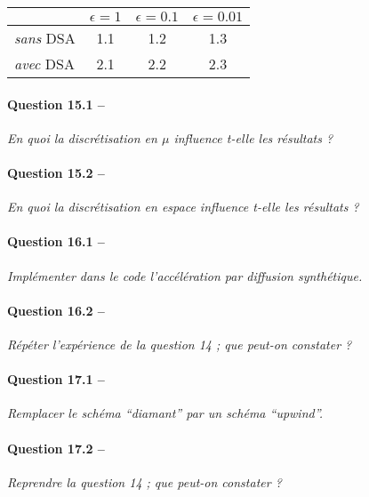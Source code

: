 \documentclass[11pt,a4paper]{article}
\newcommand{\question}[2]{\paragraph{Question #1 --}\hspace{-7pt}\textit{#2} \\}
\begin{document}
\begin{tabular}{|l|c|c|c|}
  \hline
  & $\epsilon = 1$ & $\epsilon=0.1$ & $\epsilon=0.01$ \\
  \hline\hline
  \textit{sans} DSA & 1.1 & 1.2 & 1.3 \\
  \textit{avec} DSA & 2.1 & 2.2 & 2.3 \\
  \hline
\end{tabular}












%
%
%
%
%
%
%
%
%
%

\question{15.1}{En quoi la discrétisation en $\mu$ influence t-elle les résultats ?}
\question{15.2}{En quoi la discrétisation en espace influence t-elle les résultats ?}
\question{16.1}{Implémenter dans le code l'accélération par diffusion synthétique.}
\question{16.2}{Répéter l'expérience de la question 14 ; que peut-on constater ?}
\question{17.1}{Remplacer le schéma ``diamant'' par un schéma ``upwind''.}
\question{17.2}{Reprendre la question 14 ; que peut-on constater ?}
\end{document}
